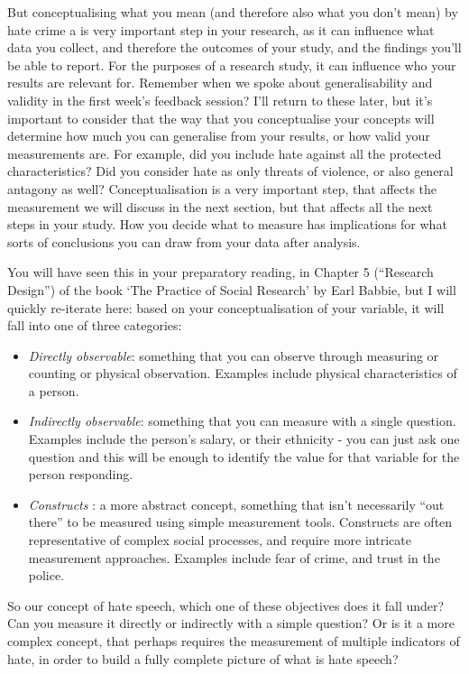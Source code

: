 \documentclass[]{book}
\providecommand{\tightlist}{%
  \setlength{\itemsep}{0pt}\setlength{\parskip}{0pt}}
\theoremstyle{definition}
\theoremstyle{definition}
\theoremstyle{definition}
\theoremstyle{remark}
\begin{document}
But conceptualising what you mean (and therefore also what you don't
mean) by hate crime a is very important step in your research, as it can
influence what data you collect, and therefore the outcomes of your
study, and the findings you'll be able to report. For the purposes of a
research study, it can influence who your results are relevant for.
Remember when we spoke about generalisability and validity in the first
week's feedback session? I'll return to these later, but it's important
to consider that the way that you conceptualise your concepts will
determine how much you can generalise from your results, or how valid
your measurements are. For example, did you include hate against all the
protected characteristics? Did you consider hate as only threats of
violence, or also general antagony as well? Conceptualisation is a very
important step, that affects the measurement we will discuss in the next
section, but that affects all the next steps in your study. How you
decide what to measure has implications for what sorts of conclusions
you can draw from your data after analysis.

You will have seen this in your preparatory reading, in Chapter 5
(``Research Design'') of the book `The Practice of Social Research' by
Earl Babbie, but I will quickly re-iterate here: based on your
conceptualisation of your variable, it will fall into one of three
categories:

\begin{itemize}
\tightlist
\item
  \emph{Directly observable}: something that you can observe through
  measuring or counting or physical observation. Examples include
  physical characteristics of a person.
\item
  \emph{Indirectly observable}: something that you can measure with a
  single question. Examples include the person's salary, or their
  ethnicity - you can just ask one question and this will be enough to
  identify the value for that variable for the person responding.
\item
  \emph{Constructs} : a more abstract concept, something that isn't
  necessarily ``out there'' to be measured using simple measurement
  tools. Constructs are often representative of complex social
  processes, and require more intricate measurement approaches. Examples
  include fear of crime, and trust in the police.
\end{itemize}

So our concept of hate speech, which one of these objectives does it
fall under? Can you measure it directly or indirectly with a simple
question? Or is it a more complex concept, that perhaps requires the
measurement of multiple indicators of hate, in order to build a fully
complete picture of what is hate speech?
\end{document}
